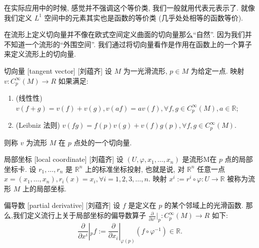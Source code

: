 \documentclass[UTF8]{ctexart}
\begin{document}
        \begin{rmk}
            []
            在实际应用中的时候, 感觉并不强调这个等价类, 我们一般就用代表元表示了. 就像我们定义 \(L^1\) 空间中的元素其实也是函数的等价类 (几乎处处相等的函数等价). 
        \end{rmk}
        
        在流形上定义切向量并不像在欧式空间定义曲面的切向量那么“自然”. 因为我们并不知道一个流形的“外围空间”. 我们通过将切向量看作是作用在函数上的一个算子来定义流形上的切向量. 
        \begin{dfn}
            []
            {切向量}
            [tangent vector]
            [刘蕴齐]
            设 \(M\) 为一光滑流形,  \(p \in M\) 为给定一点. 映射 \( v: C_p^{\infty} (M) \rightarrow R \) 如果满足:
            \begin{enumerate}
                \item (线性性)  \(v (f + g) =v( f ) + v( g ), v(a f) = av( f ), \forall f,g \in C_p^{\infty} (M), a \in \mathbb{R}\); 
                \item (Leibniz 法则)  \( v(f g) = f(p)v(g)+v(f)g(p), \forall f,g \in C_p^{\infty} (M)\).
            \end{enumerate}
            则称 \(v\) 为流形 \(M\) 在 \(p\) 点处的一个切向量. 
        \end{dfn}

        \begin{dfn}
            []
            {局部坐标}
            [local coordinate]
            [刘蕴齐]
            设 \((U, \varphi, x_1, \dots, x_n)\) 是流形M在 \(p\) 点的局部坐标卡. 设 \(r_1, \dots, r_n \) 是 \(\mathbb{R}^n\) 上的标准坐标投射, 也就是说, 对 \(\mathbb{R}^n\) 任意一点  \(x = (x_1, \dots, x_n), r_i(x) = x_i, \forall i= 1,2,3, \dots, n\).
            映射 \(x^i:= r^i \circ \varphi: U \rightarrow \mathbb{R}\) 被称为流形 \(M\) 上的局部坐标. 
        \end{dfn}

        \begin{dfn}
            []
            {偏导数}
            [partial derivative]
            [刘蕴齐]
            设 \(f\) 是定义在 \(p\) 的某个邻域上的光滑函数.  
            那么,我们定义流行上关于局部坐标的偏导数算子 \(\frac{\partial}{\partial x^i} |_p: C_p^{\infty} (M) \rightarrow R\) 如下:
                \[
                \frac{\partial}{\partial x^i} |_p f:= \frac{\partial}{\partial x_i}|_{\varphi(p)} (f \circ \varphi^{-1} ) \in \mathbb{R}.
                \]
        \end{dfn}
\end{document}
